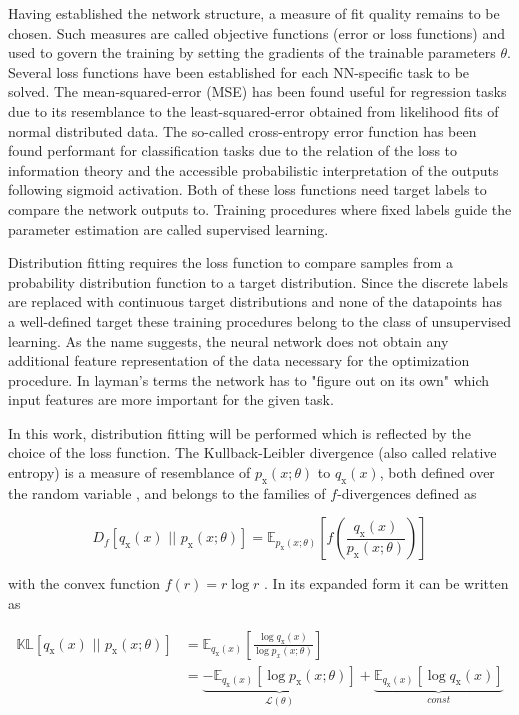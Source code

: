 
Having established the network structure, a measure of fit quality remains to be chosen. Such measures are called objective functions (error or loss functions) and used to govern the training by setting the gradients of the trainable parameters $\theta$.
Several loss functions have been established for each NN-specific task to be solved. The mean-squared-error (MSE) has been found useful for regression tasks due to its resemblance to the least-squared-error obtained from likelihood fits of normal distributed data. The so-called cross-entropy error function has been found performant for classification tasks due to the relation of the loss to information theory and the accessible probabilistic interpretation of the outputs following sigmoid activation. Both of these loss functions need target labels to compare the network outputs to. Training procedures where fixed labels guide the parameter estimation are called supervised learning.

Distribution fitting requires the loss function to compare samples from a probability distribution function to a target distribution. Since the discrete labels are replaced with continuous target distributions and none of the datapoints has a well-defined target these training procedures belong to the class of unsupervised learning. As the name suggests, the neural network does not obtain any additional feature representation of the data necessary for the optimization procedure. In layman's terms the network has to "figure out on its own" which input features are more important for the given task.

In this work, distribution fitting will be performed which is reflected by the choice of the loss function. The Kullback-Leibler divergence (also called relative entropy) is a measure of resemblance of $p_\text{x}(x; \theta)$ to $q_\text{x}(x)$, both defined over the random variable , and belongs to the families of $f$-divergences defined as

\begin{equation*}
	D_f\left[q_\text{x}(x) \, \, || \, \, p_\text{x}(x; \theta)\right] = \mathbb{E}_{p_\text{x}(x; \theta)}\left[f\left(\frac{q_\text{x}(x)}{p_\text{x}(x; \theta)}\right)\right]
\end{equation*}

with the convex function $f(r) = r\log r$ \cite{Papamakarios_NF}. In its expanded form it can be written as

\begin{equation}
	\begin{aligned}
		\mathbb{KL}\left[q_\text{x}(x) \, \, || \, \, p_\text{x}(x; \theta)\right] &= \mathbb{E}_{q_\text{x}(x)}\left[\frac{\log q_\text{x}(x)}{\log p_x(x; \theta)}\right] \\&= \underbrace{- \mathbb{E}_{q_\text{x}(x)} \left[ \log p_\text{x}(x; \theta)\right]}_{\mathcal{L}(\theta)} + \underbrace{\mathbb{E}_{q_\text{x}(x)}\left[\log q_\text{x}(x)\right]}_{const}
	\end{aligned}
	\label{eq:KL-loss}
\end{equation}

